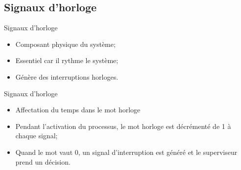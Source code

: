 \def\subsectitle{Signaux d'horloge}
\subsection{\subsectitle}

\begin{frame}{\sectitle}
\begin{block}{\subsectitle}
\begin{itemize}
    \item Composant physique du système;
    \item Essentiel car il rythme le système;
    \item Génère des interruptions horloges.
\end{itemize}
\end{block}

\begin{exampleblock}{\subsectitle}
\begin{itemize}
    \item Affectation du temps dans le mot horloge
    \item Pendant l'activation du processus, le mot horloge est décrémenté de 1
    à chaque signal;
    \item Quand le mot vaut 0, un signal d'interruption est généré et le
    superviseur prend un décision.
\end{itemize}
\end{exampleblock}

\end{frame}


